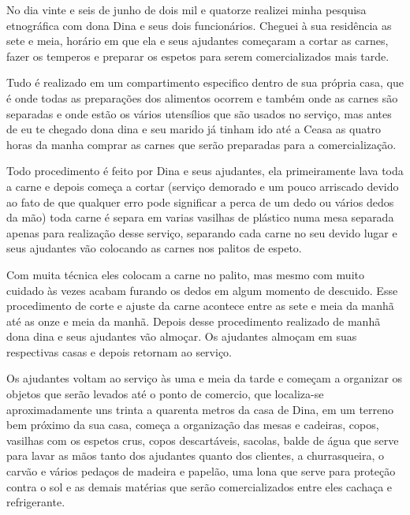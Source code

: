 No dia vinte e seis de junho de dois mil e quatorze realizei minha pesquisa etnográfica com dona Dina e seus dois funcionários. Cheguei à sua residência as sete e meia, horário em que ela e seus ajudantes começaram a cortar as carnes, fazer os temperos e preparar os espetos para serem comercializados mais tarde.

Tudo é realizado em um compartimento especifico dentro de sua própria casa, que é onde todas as preparações dos alimentos ocorrem e também onde as carnes são separadas e onde estão os vários utensílios que são usados no serviço, mas antes de eu te chegado dona dina e seu marido já tinham ido até a Ceasa as quatro horas da manha comprar as carnes que serão preparadas para a comercialização.

Todo procedimento é feito por Dina e seus ajudantes, ela primeiramente lava toda a carne e depois começa a cortar (serviço demorado e um pouco arriscado devido ao fato de que qualquer erro pode significar a perca de um dedo ou vários dedos da mão) toda carne é separa em varias vasilhas de plástico numa mesa separada apenas para realização desse serviço, separando cada carne no seu devido lugar e seus ajudantes vão colocando as carnes nos palitos de espeto.

Com muita técnica eles colocam a carne no palito, mas mesmo com muito cuidado às vezes acabam furando os dedos em algum momento de descuido. Esse procedimento de corte e ajuste da carne acontece entre as sete e meia da manhã até as onze e meia da manhã. Depois desse procedimento realizado de manhã dona dina e seus ajudantes vão almoçar. Os ajudantes almoçam em suas respectivas casas e depois retornam ao serviço.

Os ajudantes voltam ao serviço às uma e meia da tarde e começam a organizar os objetos que serão levados até o ponto de comercio, que localiza-se aproximadamente uns trinta a quarenta metros da casa de Dina, em um terreno bem próximo da sua casa, começa a organização das mesas e cadeiras, copos, vasilhas com os espetos crus, copos descartáveis, sacolas, balde de água que serve para lavar as mãos tanto dos ajudantes quanto dos clientes, a churrasqueira, o carvão e vários pedaços de madeira e papelão, uma lona que serve para proteção contra o sol e as demais matérias que serão comercializados entre eles cachaça e refrigerante.

